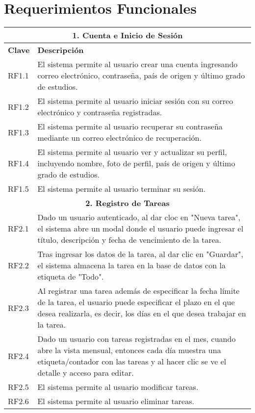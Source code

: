\documentclass[11pt]{article}
\begin{document}
\section{Requerimientos Funcionales}
\begin{table}[H]
    \centering
    \begin{tabular}{|p{2cm}|p{13cm}|}
    \hline
    \multicolumn{2}{|c|}{\textbf{1. Cuenta e Inicio de Sesión}} \\
    \hline
    \textbf{Clave} & \textbf{Descripción } \\
    \hline
    RF1.1 & El sistema permite al usuario crear una cuenta ingresando correo electrónico, contraseña,
     país de origen y último grado de estudios. \\
     \hline
    RF1.2 & El sistema permite al usuario iniciar sesión con su correo electrónico y contraseña registradas. \\
    \hline
    RF1.3 & El sistema permite al usuario recuperar su contraseña mediante un correo electrónico de recuperación.\\
    \hline
    RF1.4 & El sistema permite al usuario ver y actualizar su perfil, incluyendo nombre, foto de perfil, país de origen y último grado de estudios. \\
    \hline
    RF1.5 & El sistema permite al usuario terminar su sesión.\\
    \hline
    \multicolumn{2}{|c|}{\textbf{2. Registro de Tareas}} \\
    \hline
    RF2.1 & Dado un usuario autenticado, al dar cloc en "Nueva tarea", el sistema abre un modal donde el usuario puede ingresar el título, descripción
     y fecha de vencimiento de la tarea. \\
    \hline
    RF2.2 & Tras ingresar los datos de la tarea, al dar clic en "Guardar", el sistema almacena la tarea en la base de datos con la etiqueta de "Todo".\\
    \hline
    RF2.3 & Al registrar una tarea además de especificar la fecha límite de la tarea, el usuario puede especificar el plazo en el que desea realizarla, es decir,
     los días en el que desea trabajar en la tarea. \\
    \hline
    RF2.4 & Dado un usuario con tareas registradas en el mes, cuando abre la vista mensual, entonces cada día muestra una etiqueta/contador con las tareas 
    y al hacer clic se ve el detalle y acceso para editar. \\
    \hline
    RF2.5 & El sistema permite al usuario modificar tareas. \\
    \hline
    RF2.6 & El sistema permite al usuario eliminar tareas. \\
    \hline
    \end{tabular}
    \label{tab:requisitos-funcionales-1}
\end{table}
\end{document}
